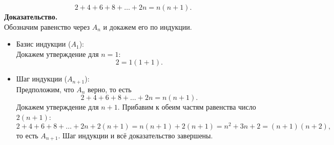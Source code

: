 \documentclass[a4paper,12pt]{article}
\begin{document}
$$2+4+6+8+\ldots +2n =n(n+1).$$ 
{\bf Доказательство.} \\
Обозначим равенство через $A_n$ и докажем его по индукции. \\
\begin{itemize}
\item Базис индукции ($A_1$): \\
Докажем утверждение для $n=1$: \\
$$2 = 1(1+1).$$
\item Шаг индукции ($A_{n+1}$): \\
Предположим, что $A_n$ верно, то есть \\
$$2+4+6+8+\ldots +2n =n(n+1).$$ 
Докажем утверждение для $n+1$. Прибавим к обеим частям равенства число $2(n+1)$: \\
$$2+4+6+8+\ldots +2n + 2(n+1) =n(n+1)+2(n+1) = n^2+3n+2 = (n+1)(n+2),$$
то есть $A_{n+1}$. Шаг индукции и всё доказательство завершены.\\


\end{itemize}
\end{document}
